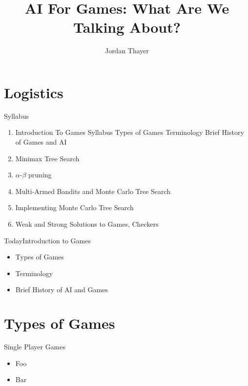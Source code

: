 \documentclass{powerdot}
\title{AI For Games: What Are We Talking About?}
\author{Jordan Thayer}
\date{\vspace{0.2in}}
\begin{document}
\maketitle

\section[slide=false]{Logistics}
\begin{slide}{Syllabus}
  \begin{enumerate}
    \item Introduction To Games
      \subitem Syllabus
      \subitem Types of Games
      \subitem Terminology
      \subitem Brief History of Games and AI
    \item Minimax Tree Search
    \item $\alpha$-$\beta$ pruning
    \item Multi-Armed Bandits and Monte Carlo Tree Search
    \item Implementing Monte Carlo Tree Search
    \item Weak and Strong Solutions to Games, Checkers
  \end{enumerate}
\end{slide}

\begin{slide}{Today\hfill Introduction to Games}
  \begin{itemize}
    \item Types of Games
    \item Terminology
    \item Brief History of AI and Games
  \end{itemize}
\end{slide}
\section{Types of Games}

\begin{slide}{Single Player Games}
            {
              \begin{itemize}
              \item Foo
              \item Bar
              \end{itemize}
            }
\end{slide}
\end{document}
